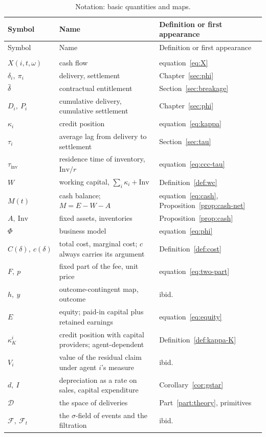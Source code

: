 \begin{longtable}{@{}>{\raggedright\arraybackslash}p{}>{\raggedright\arraybackslash}p{}>{\raggedright\arraybackslash}p{}@{}}
\caption{Notation: basic quantities and maps.}\label{tab:notation-basic}\\
\toprule
Symbol & Name & Definition or first appearance \\
\midrule
\endfirsthead
\toprule
Symbol & Name & Definition or first appearance \\
\midrule
\endhead
\midrule
\multicolumn{3}{r}{\footnotesize (continued on the next page)}\\
\endfoot
\bottomrule
\endlastfoot
$X(i,t,\omega)$ & cash flow & equation~\eqref{eq:X} \\
$\delta_i,\ \pi_i$ & delivery, settlement & Chapter~\ref{sec:phi} \\
$\dbar$ & contractual entitlement & Section~\ref{sec:breakage} \\
$D_i,\ P_i$ & cumulative delivery, cumulative settlement & Chapter~\ref{sec:phi} \\
$\kappa_i$ & credit position & equation~\eqref{eq:kappa} \\
$\tau_i$ & average lag from delivery to settlement & Section~\ref{sec:tau} \\
$\tau_{\mathrm{inv}}$ & residence time of inventory, $\mathrm{Inv}/r$ & equation~\eqref{eq:ccc-tau} \\
$W$ & working capital, $\sum_i\kappa_i+\mathrm{Inv}$ & Definition~\ref{def:wc} \\
$M(t)$ & cash balance; $M=E-W-A$ & equation~\eqref{eq:cash}, Proposition~\ref{prop:cash-net} \\
$A,\ \mathrm{Inv}$ & fixed assets, inventories & Proposition~\ref{prop:cash} \\
$\Phi$ & business model & equation~\eqref{eq:phi} \\
$C(\delta),\ c(\delta)$ & total cost, marginal cost; $c$ always carries its argument & Definition~\ref{def:cost} \\
$F,\ p$ & fixed part of the fee, unit price & equation~\eqref{eq:two-part} \\
$h,\ y$ & outcome-contingent map, outcome & ibid. \\
$E$ & equity; paid-in capital plus retained earnings & equation~\eqref{eq:equity} \\
$\kappa_K^{i}$ & credit position with capital providers; agent-dependent & Definition~\ref{def:kappa-K} \\
$V_i$ & value of the residual claim under agent $i$'s measure & ibid. \\
$d,\ I$ & depreciation as a rate on sales, capital expenditure & Corollary~\ref{cor:gstar} \\
$\mathcal{D}$ & the space of deliveries & Part~\ref{part:theory}, primitives \\
$\mathcal{F},\ \mathcal{F}_t$ & the $\sigma$-field of events and the filtration & ibid. \\
\end{longtable}

